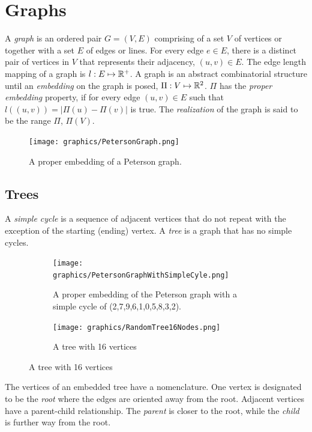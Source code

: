 \section{Graphs}
A \textit{graph} is an 
ordered pair $G = (V,E)$ comprising of a set $V$ of vertices or together with a set $E$ of edges or 
lines.  For every edge $e \in E$, there is a distinct pair of vertices in $V$ 
that represents their adjacency, 
$(u,v) \in E$. The edge length mapping of a graph is $l: E \mapsto 
{\mathbb{R}}^+$. A graph is an abstract combinatorial structure until an \textit{embedding} on the 
graph is posed, $\Pi : V \mapsto {\mathbb{R}}^{2}$. $\Pi$ has the \textit{proper 
embedding} property, if for every edge $(u,v) \in E$ such that $l\left( \left(u,v\right) \right) 
= \left\vert \Pi(u) - \Pi(v) \right\vert$ is true. The \textit{realization} of the graph is 
said to be the range $\Pi$, $\Pi(V)$.
\begin{figure}[!htbp]
\begin{center}
\texttt{[image: graphics/PetersonGraph.png]}
\caption{A proper embedding of a Peterson graph.}
\end{center} 
\end{figure} 
\subsection{Trees}
A \textit{simple  cycle} is a sequence of adjacent vertices that do not repeat with the exception 
of the starting (ending) vertex. A \textit{tree} is a graph that has no simple cycles. 
\begin{figure}[h]
\begin{center}
  \begin{subfigure}[b]{0.49\textwidth}
    \texttt{[image: graphics/PetersonGraphWithSimpleCyle.png]}
    \caption{A proper embedding of the Peterson graph with a simple cycle of 
    (2,7,9,6,1,0,5,8,3,2).}\label{fig:ch1-graph-2}
  \end{subfigure}
  \begin{subfigure}[b]{0.49\textwidth}
    \texttt{[image: graphics/RandomTree16Nodes.png]}
    \caption{A tree with 16 vertices}\label{fig:ch1-graph-3}
  \end{subfigure}
\end{center}
\end{figure}
The vertices of an embedded tree have a nomenclature.  One vertex is designated to be the 
\textit{root} where the edges are oriented away from the root.  Adjacent vertices have a 
parent-child relationship.  The \textit{parent} is closer to the root, while the \textit{child} is 
further way from the root.
